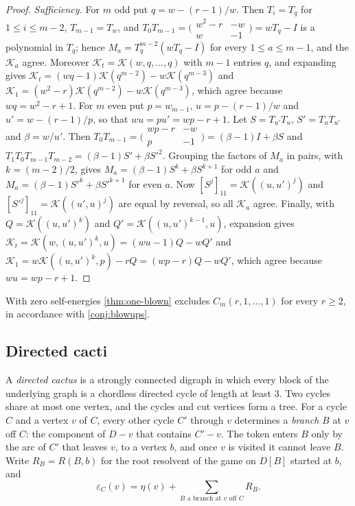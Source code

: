 \documentclass[final]{siamart0516}
\numberwithin{theorem}{section}
\numberwithin{equation}{section}
\theoremstyle{siamnonum}
\theoremstyle{plain}
\newcommand{\cont}{\mathcal{K}}           %
\begin{document}
\begin{proof}
\emph{Sufficiency.} For $m$ odd put $q=w-(r-1)/w$. Then $T_i=T_q$ for $1\le i\le m-2$, $T_{m-1}=T_w$, and $T_0T_{m-1}=\bigl(\begin{smallmatrix}w^2-r&-w\\w&-1\end{smallmatrix}\bigr)=wT_q-I$ is a polynomial in $T_q$; hence $M_a=T_q^{m-2}(wT_q-I)$ for every $1\le a\le m-1$, and the $\cont_a$ agree. Moreover $\cont_t=\cont(w,q,\dots,q)$ with $m-1$ entries $q$, and expanding gives $\cont_t=(wq-1)\cont(q^{m-2})-w\cont(q^{m-3})$ and $\cont_1=(w^2-r)\cont(q^{m-2})-w\cont(q^{m-3})$, which agree because $wq=w^2-r+1$. For $m$ even put $p=w_{m-1}$, $u=p-(r-1)/w$ and $u'=w-(r-1)/p$, so that $wu=pu'=wp-r+1$. Let $S=T_{u'}T_u$, $S'=T_uT_{u'}$ and $\beta=w/u'$. Then $T_0T_{m-1}=\bigl(\begin{smallmatrix}wp-r&-w\\p&-1\end{smallmatrix}\bigr)=(\beta-1)I+\beta S$ and $T_1T_0T_{m-1}T_{m-2}=(\beta-1)S'+\beta S'^2$. Grouping the factors of $M_a$ in pairs, with $k=(m-2)/2$, gives $M_a=(\beta-1)S^{k}+\beta S^{k+1}$ for odd $a$ and $M_a=(\beta-1)S'^{k}+\beta S'^{k+1}$ for even $a$. Now $[S^{j}]_{11}=\cont((u,u')^{j})$ and $[S'^{j}]_{11}=\cont((u',u)^{j})$ are equal by reversal, so all $\cont_a$ agree. Finally, with $Q=\cont((u,u')^{k})$ and $Q'=\cont((u,u')^{k-1},u)$, expansion gives $\cont_t=\cont(w,(u,u')^{k},u)=(wu-1)Q-wQ'$ and $\cont_1=w\cont((u,u')^{k},p)-rQ=(wp-r)Q-wQ'$, which agree because $wu=wp-r+1$.
\end{proof}

With zero self-energies \cref{thm:one-blown} excludes $C_m(r,1,\dots,1)$ for every $r\ge2$, in accordance with \cref{conj:blowups}.

\subsection{Directed cacti}
A \emph{directed cactus} is a strongly connected digraph in which every block of the underlying graph is a chordless directed cycle of length at least $3$. Two cycles share at most one vertex, and the cycles and cut vertices form a tree. For a cycle $C$ and a vertex $v$ of $C$, every other cycle $C'$ through $v$ determines a \emph{branch} $B$ at $v$ off $C$: the component of $D-v$ that contains $C'-v$. The token enters $B$ only by the arc of $C'$ that leaves $v$, to a vertex $b$, and once $v$ is visited it cannot leave $B$. Write $R_B=R(B,b)$ for the root resolvent of the game on $D[B]$ started at $b$, and
\[
\varepsilon_C(v)=\eta(v)+\sum_{B\text{ a branch at }v\text{ off }C}R_B.
\]
\end{document}
